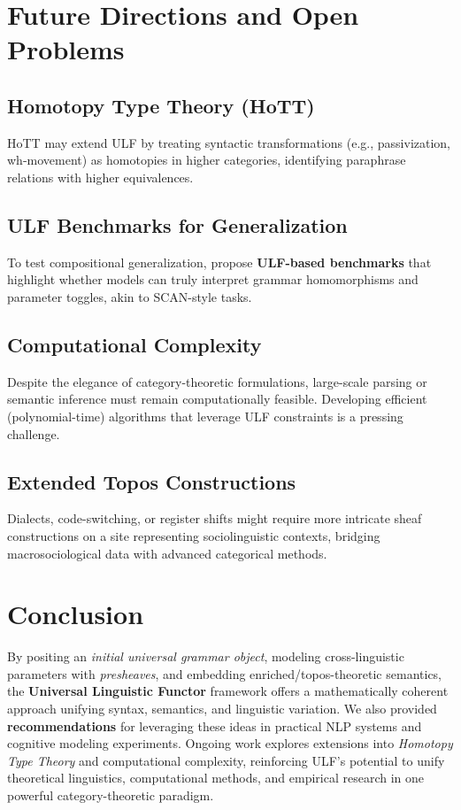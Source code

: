 \documentclass[12pt]{article}
\theoremstyle{plain}
\theoremstyle{definition}
\begin{document}
\section{Future Directions and Open Problems}

\subsection{Homotopy Type Theory (HoTT)}
HoTT may extend ULF by treating syntactic transformations (e.g., passivization, wh-movement) as homotopies in higher categories, identifying paraphrase relations with higher equivalences.

\subsection{ULF Benchmarks for Generalization}
To test compositional generalization, propose \textbf{ULF-based benchmarks} that highlight whether models can truly interpret grammar homomorphisms and parameter toggles, akin to SCAN-style tasks.

\subsection{Computational Complexity}
Despite the elegance of category-theoretic formulations, large-scale parsing or semantic inference must remain computationally feasible. Developing efficient (polynomial-time) algorithms that leverage ULF constraints is a pressing challenge.

\subsection{Extended Topos Constructions}
Dialects, code-switching, or register shifts might require more intricate sheaf constructions on a site representing sociolinguistic contexts, bridging macrosociological data with advanced categorical methods.

\section{Conclusion}
By positing an \emph{initial universal grammar object}, modeling cross-linguistic parameters with \emph{presheaves}, and embedding enriched/topos-theoretic semantics, the \textbf{Universal Linguistic Functor} framework offers a mathematically coherent approach unifying syntax, semantics, and linguistic variation. We also provided \textbf{recommendations} for leveraging these ideas in practical NLP systems and cognitive modeling experiments. Ongoing work explores extensions into \emph{Homotopy Type Theory} and computational complexity, reinforcing ULF’s potential to unify theoretical linguistics, computational methods, and empirical research in one powerful category-theoretic paradigm.
\end{document}
